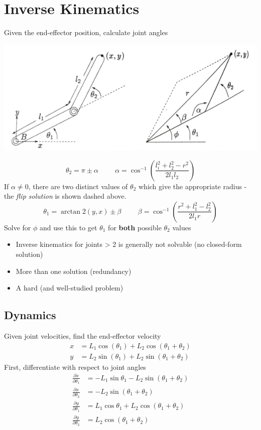 \documentclass[10pt]{article}
\begin{document}
\section*{Inverse Kinematics}
Given the end-effector position, calculate joint angles
\begin{center} 
	\includegraphics*[width=\textwidth]{L1_19.png} 
\end{center}

\[\theta_2 = \pi \pm \alpha \hspace{1cm} \alpha = \cos^{-1} \left(\frac{l_i^2 + l_2^2 - r^2}{2l_1 l_2}\right)\]
If $\alpha \neq 0$, there are two distinct values of $\theta_2$ which give the appropriate radius - the \textit{flip solution} is shown dashed above.
\[\theta_1 = \arctan2(y, x) \pm \beta \hspace{1cm} \beta = \cos^{-1} \left(\frac{r^2 + l_1^2 - l_2^2}{2l_1 r}\right)\]
Solve for $\phi$ and use this to get $\theta_1$ for \textbf{both} possible $\theta_2$ values
\begin{itemize}
	\item Inverse kinematics for joints > 2 is generally not solvable (no closed-form solution)
	\item More than one solution (redundancy)
	\item A hard (and well-studied problem)
\end{itemize}

\subsection*{Dynamics}
Given joint velocities, find the end-effector velocity
\begin{align*}
    x &= L_1 \cos(\theta_1) + L_2 \cos(\theta_1 + \theta_2)\\
    y &= L_2 \sin(\theta_1) + L_2 \sin(\theta_1 + \theta_2)
\end{align*}
First, differentiate with respect to joint angles
\begin{align*}
    \frac{\partial x}{\partial \theta_1} &= -L_1 \sin \theta_1 - L_2 \sin(\theta_1 + \theta_2)\\
    \frac{\partial x}{\partial \theta_2} &= -L_2 \sin(\theta_1 + \theta_2)\\
    \frac{\partial y}{\partial \theta_1} &= L_1 \cos \theta_1 + L_2 \cos(\theta_1 + \theta_2)\\
    \frac{\partial y}{\partial \theta_2} &= L_2 \cos(\theta_1 + \theta_2)
\end{align*}
\end{document}
